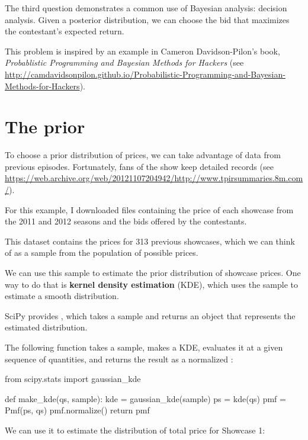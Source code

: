 \documentclass[12pt]{book}
\theoremstyle{exercise}
\begin{document}
The third question demonstrates a common use of Bayesian analysis:
decision analysis.  Given a posterior distribution, we can choose
the bid that maximizes the contestant's expected return.


This problem is inspired by an example in Cameron Davidson-Pilon's
book, {\it Probablistic Programming and Bayesian Methods for Hackers}
(see \url{http://camdavidsonpilon.github.io/Probabilistic-Programming-and-Bayesian-Methods-for-Hackers}).



\section{The prior}

To choose a prior distribution of prices, we can take advantage
of data from previous episodes.  
Fortunately, fans of the show keep detailed records (see \url{https://web.archive.org/web/20121107204942/http://www.tpirsummaries.8m.com/}).  

For this example, I downloaded files containing the price of each showcase from the 2011 and 2012 seasons and the bids offered by the contestants.

This dataset contains the prices for 313 previous showcases, which we can think of as a sample from the population of possible prices.

We can use this sample to estimate the prior distribution of showcase prices.
One way to do that is {\bf kernel density estimation} (KDE), which uses the sample to estimate a smooth distribution.

SciPy provides , which takes a sample and returns an object that represents the estimated distribution.

The following function takes a sample, makes a KDE, evaluates it at a given sequence of quantities, and returns the result as a normalized :

\begin{code}
from scipy.stats import gaussian_kde

def make_kde(qs, sample):
    kde = gaussian_kde(sample)
    ps = kde(qs)
    pmf = Pmf(ps, qs)
    pmf.normalize()
    return pmf
\end{code}

We can use it to estimate the distribution of total price for Showcase 1:
\end{document}
